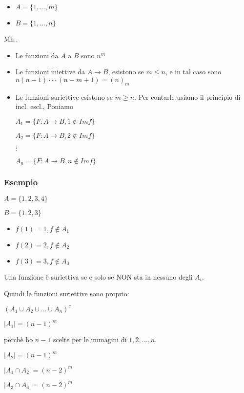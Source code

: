 \documentclass[11pt]{article}
\begin{document}
		\begin{itemize}
			\item $A = \{1,\ldots,m\}$
			\item $B = \{1,\ldots,n\}$
		\end{itemize}
		
		Mh..

		\begin{itemize}
			\item  Le funzioni da $A$ a $B$ sono $n^{m}$
			\item Le funzioni iniettive da $A \to B$, esistono se $m \leq n$,
				e in tal caso sono $n(n-1)\cdot\cdot\cdot(n-m+1) = (n)_{m}$
			\item Le funzioni suriettive esistono se $m \geq n$.
				Per contarle usiamo il principio di incl. escl.,
				Poniamo 
				
				$A_1 = \{F:A \to  B , 1 \not\in Imf\}$
				
				$A_2 = \{F : A \to  B , 2 \not\in  Imf\}$

				$\vdots$

				$A_n = \{F:A \to  B, n \not\in Imf\}$
		\end{itemize}
		
		\subsubsection{Esempio}
		
		$A = \{1,2,3,4\}$

		$B = \{1,2,3\}$
		
		\begin{itemize}
			\item $f(1) = 1, f \not\in A_1$
			\item $f(2) = 2, f \not\in  A_2$
			\item $f(3) = 3 , f \not\in A_3$
		\end{itemize}
		
		Una funzione \`e suriettiva se e solo se NON sta in nessuno degli $A_i$.

		Quindi le funzioni suriettive sono proprio:

		$(A_1 \cup A_2 \cup \ldots \cup A_n)^{c}$
		
		$|A_1| = (n-1)^{m}$

		perch\`e ho $n-1$ scelte per le immagini di $1,2,\ldots,n$.

		$|A_2|=(n-1)^{m}$

		$|A_1 \cap A_2| = (n-2)^{m}$

		$|A_3 \cap A_6| = (n-2)^{m}$
\end{document}
